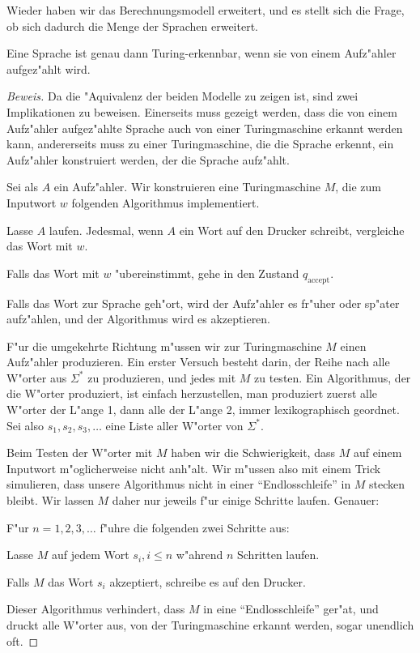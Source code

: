 Wieder haben wir das Berechnungsmodell erweitert, und es stellt sich
die Frage, ob sich dadurch die Menge der Sprachen erweitert. 

\begin{satz}
Eine Sprache ist genau dann Turing-erkennbar, wenn sie
von einem Aufz"ahler aufgez"ahlt wird.\end{satz}

\begin{proof}[Beweis]
Da die "Aquivalenz der beiden Modelle zu zeigen ist, sind zwei Implikationen
zu beweisen. Einerseits muss gezeigt werden, dass die von einem
Aufz"ahler aufgez"ahlte Sprache auch von einer Turingmaschine
erkannt werden kann, andererseits muss zu einer Turingmaschine, die
die Sprache erkennt, ein Aufz"ahler konstruiert werden, der die Sprache 
aufz"ahlt.

Sei als $A$ ein Aufz"ahler. Wir konstruieren eine Turingmaschine $M$, die
zum Inputwort $w$ folgenden Algorithmus implementiert.
\begin{compactenum}
\item Lasse $A$ laufen. Jedesmal, wenn $A$ ein Wort auf den Drucker schreibt,
vergleiche das Wort mit $w$.
\item Falls das Wort mit $w$ "ubereinstimmt, gehe in den Zustand
$q_{\text{accept}}$.
\end{compactenum}
Falls das Wort zur Sprache geh"ort, wird der Aufz"ahler es fr"uher
oder sp"ater aufz"ahlen, und der Algorithmus wird es akzeptieren.

F"ur die umgekehrte Richtung m"ussen wir zur Turingmaschine $M$
einen Aufz"ahler produzieren. 
Ein erster Versuch besteht darin, der Reihe nach alle W"orter aus
$\Sigma^*$ zu produzieren, und jedes mit $M$ zu testen.
Ein Algorithmus, der die W"orter produziert, ist einfach herzustellen,
man produziert zuerst alle W"orter der L"ange 1, dann alle der L"ange 2, 
immer lexikographisch geordnet.
Sei also $s_1,s_2,s_3,\dots$ eine Liste aller W"orter von $\Sigma^*$.

Beim Testen der W"orter mit $M$
haben wir die Schwierigkeit, dass $M$ auf einem Inputwort
m"oglicherweise nicht anh"alt. Wir m"ussen also mit einem Trick
simulieren, dass unsere Algorithmus nicht in einer ``Endlosschleife''
in $M$ stecken bleibt. Wir lassen $M$ daher nur jeweils f"ur einige
Schritte laufen. 
Genauer: 
\begin{compactenum}
\item F"ur $n=1,2,3,\dots$ f"uhre die folgenden zwei Schritte aus:
\item Lasse $M$ auf jedem Wort $s_i, i \le n$ w"ahrend $n$ Schritten
laufen.
\item Falls $M$ das Wort $s_i$ akzeptiert, schreibe es auf den Drucker.
\end{compactenum}
Dieser Algorithmus verhindert, dass $M$ in eine ``Endlosschleife'' 
ger"at, und druckt alle W"orter aus, von der Turingmaschine erkannt
werden, sogar unendlich oft.
\end{proof}

